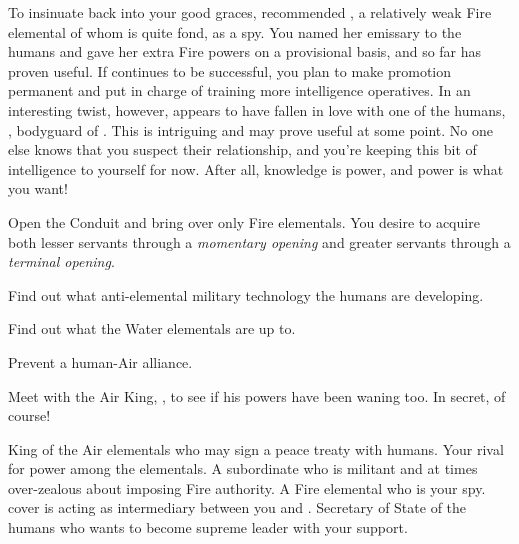 \documentclass[char]{elementals}
\begin{document}
 To insinuate \cPyro{\themself} back into your good graces, \cPyro{} recommended \cJuliet{\intro}, a relatively weak Fire elemental of whom \cPyro{} is quite fond, as a spy.  You named her emissary to the humans and gave her extra Fire powers on a provisional basis, and so far \cJuliet{\they} has proven useful.  If \cJuliet{\they} continues to be successful, you plan to make \cJuliet{\their} promotion permanent and put \cJuliet{\their} in charge of training more intelligence operatives.  In an interesting twist, however, \cJuliet{} appears to have fallen in love with one of the humans, \cRomeo{\intro}, bodyguard of \cLeader{}.  This is intriguing and may prove useful at some point.  No one else knows that you suspect their relationship, and you're keeping this bit of intelligence to yourself for now.  After all, knowledge is power, and power is what you want!




\begin{itemz}[Goals]
  \item Open the Conduit and bring over only Fire elementals. You desire to acquire both lesser servants through a \emph{momentary opening} and greater servants through a \emph{terminal opening}.
  \item Find out what anti-elemental military technology the humans are developing.
  \item Find out what the Water elementals are up to.
  \item Prevent a human-Air alliance.
  \item Meet with the Air King, \cKing{\full}, to see if his powers have been waning too.  In secret, of course!
\end{itemz}

\begin{contacts}
  \contact{\cKing{}} King of the Air elementals who may sign a peace treaty with humans.  Your rival for power among the elementals.
  \contact{\cPyro{}} A subordinate who is militant and at times over-zealous about imposing Fire authority.
  \contact{\cJuliet{}} A Fire elemental who is your spy.  \cJuliet{\Their} cover is acting as intermediary between you and \cKing{}.
  \contact{\cDema{}} Secretary of State of the humans who wants to become supreme leader with your support.
\end{contacts}
\end{document}

